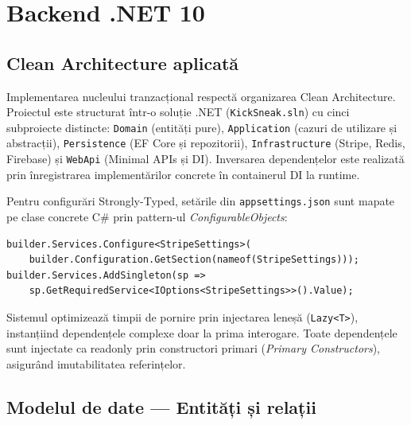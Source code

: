 \chapter{Backend .NET 10}

\section{Clean Architecture aplicată}

Implementarea nucleului tranzacțional respectă organizarea Clean Architecture. Proiectul este structurat într-o soluție .NET (\texttt{KickSneak.sln}) cu cinci subproiecte distincte: \texttt{Domain} (entități pure), \texttt{Application} (cazuri de utilizare și abstracții), \texttt{Persistence} (EF Core și repozitorii), \texttt{Infrastructure} (Stripe, Redis, Firebase) și \texttt{WebApi} (Minimal APIs și DI). Inversarea dependențelor este realizată prin înregistrarea implementărilor concrete în containerul DI la runtime.

Pentru configurări Strongly-Typed, setările din \texttt{appsettings.json} sunt mapate pe clase concrete C\# prin pattern-ul \textit{ConfigurableObjects}:
\begin{lstlisting}[language={[sharp]C}]
builder.Services.Configure<StripeSettings>(
    builder.Configuration.GetSection(nameof(StripeSettings)));
builder.Services.AddSingleton(sp => 
    sp.GetRequiredService<IOptions<StripeSettings>>().Value);
\end{lstlisting}

Sistemul optimizează timpii de pornire prin injectarea leneșă (\texttt{Lazy<T>}), instanțiind dependențele complexe doar la prima interogare. Toate dependențele sunt injectate ca readonly prin constructori primari (\textit{Primary Constructors}), asigurând imutabilitatea referințelor.

\section{Modelul de date --- Entități și relații}


